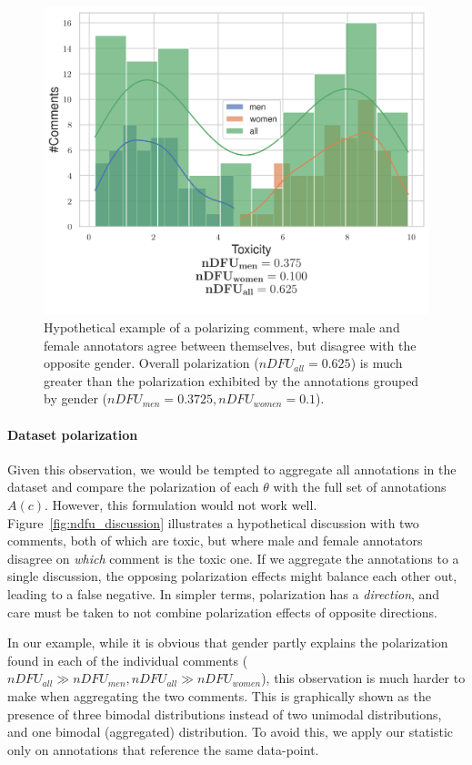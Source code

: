 \documentclass[twocolumn, 8pt]{article}
\begin{document}
\begin{figure}
	\centering
	\includegraphics[width=0.8\linewidth]{ndfu_combined.png}
	\caption{Hypothetical example of a polarizing comment, where male and female annotators agree between themselves, but disagree with the opposite gender. Overall polarization ($nDFU_{all} = 0.625$) is much greater than the polarization exhibited by the annotations grouped by gender ($nDFU_{men} = 0.3725, nDFU_{women} = 0.1$).}
	\label{fig:ndfu_combined}
\end{figure}

\paragraph{Dataset polarization} Given this observation, we would be tempted to aggregate all annotations in the dataset and compare the polarization of each $\theta$ with the full set of annotations $A(c)$. However, this formulation would not work well. Figure~\ref{fig:ndfu_discussion} illustrates a hypothetical discussion with two comments, both of which are toxic, but where male and female annotators disagree on \emph{which} comment is the toxic one. If we aggregate the annotations to a single discussion, the opposing polarization effects might balance each other out, leading to a false negative. In simpler terms, polarization has a \textit{direction}, and care must be taken to not combine polarization effects of opposite directions.

In our example, while it is obvious that gender partly explains the polarization found in each of the individual comments ($nDFU_{all} \gg nDFU_{men}, nDFU_{all} \gg nDFU_{women}$), this observation is much harder to make when aggregating the two comments. This is graphically shown as the presence of three bimodal distributions instead of two unimodal distributions, and one bimodal (aggregated) distribution. To avoid this, we apply our statistic only on annotations that reference the same data-point.
\end{document}
